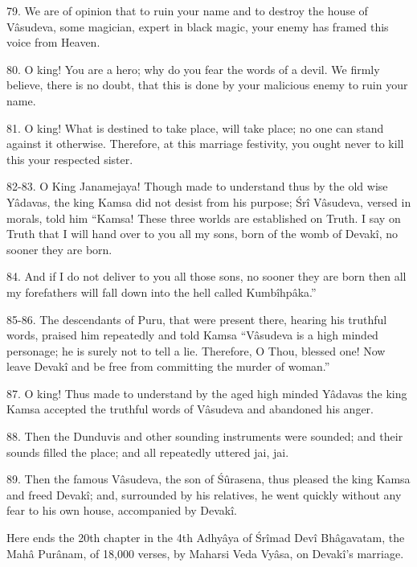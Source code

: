 79. We are of opinion that to ruin your name and to destroy the house of V\^asudeva, some magician, expert in black magic, your enemy has framed this voice from Heaven.

80. O king! You are a hero; why do you fear the words of a devil. We firmly believe, there is no doubt, that this is done by your malicious enemy to ruin your name.

81. O king! What is destined to take place, will take place; no one can stand against it otherwise. Therefore, at this marriage festivity, you ought never to kill this your respected sister.

82-83. O King Janamejaya! Though made to understand thus by the old wise Y\^adavas, the king Kamsa did not desist from his purpose; \'Sr\^i V\^asudeva, versed in morals, told him ``Kamsa! These three worlds are established on Truth. I say on Truth that I will hand over to you all my sons, born of the womb of Devak\^i, no sooner they are born.

84. And if I do not deliver to you all those sons, no sooner they are born then all my forefathers will fall down into the hell called Kumb\^ihp\^aka.''

85-86. The descendants of Puru, that were present there, hearing his truthful words, praised him repeatedly and told Kamsa ``V\^asudeva is a high minded personage; he is surely not to tell a lie. Therefore, O Thou, blessed one! Now leave Devak\^i and be free from committing the murder of woman.''

87. O king! Thus made to understand by the aged high minded Y\^adavas the king Kamsa accepted the truthful words of V\^asudeva and abandoned his anger.

88. Then the Dunduvis and other sounding instruments were sounded; and their sounds filled the place; and all repeatedly uttered jai, jai.

89. Then the famous V\^asudeva, the son of \'Sûrasena, thus pleased the king Kamsa and freed Devak\^i; and, surrounded by his relatives, he went quickly without any fear to his own house, accompanied by Devak\^i.

Here ends the 20th chapter in the 4th Adhy\^aya of \'Sr\^imad Dev\^i Bh\^agavatam, the Mah\^a Pur\^anam, of 18,000 verses, by Maharsi Veda Vy\^asa, on Devak\^i's marriage.

